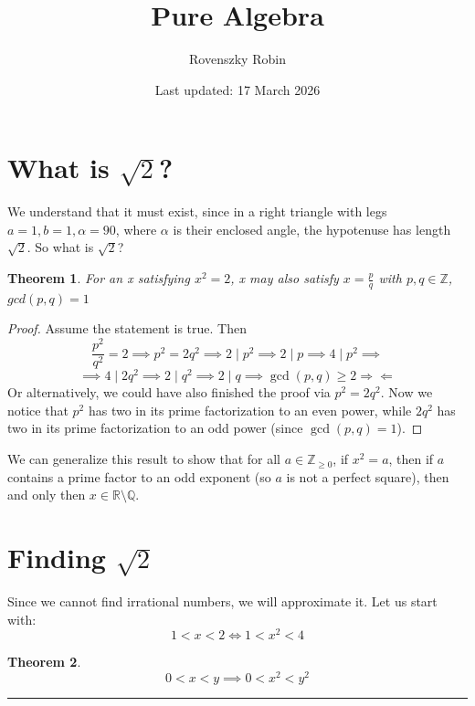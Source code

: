 \documentclass{article}
\title{Pure Algebra}
\author{Rovenszky Robin}
\date{Last updated: 17 March 2026}
\newtheorem{theorem}{Theorem}
\begin{document}
\maketitle

\section{What is $\sqrt{2}$?}
We understand that it must exist, since in a right triangle with legs $a = 1, b= 1, \alpha = 90$, where $\alpha$ is their enclosed angle, the hypotenuse has length $\sqrt{2}$. So what is $\sqrt{2}$?
\\
\begin{theorem}
    For an x satisfying $x^2 = 2$, x may also satisfy $x = \frac{p}{q}$ with $p, q \in \mathbb{Z}$, $gcd(p, q) = 1$
\end{theorem}
\begin{proof}
    Assume the statement is true. Then
    \begin{equation}
        \frac{p^2}{q^2} = 2 \implies p^2 = 2q^2 \implies 2 \mid p^2 \implies 2 \mid p \implies 4 \mid p^2 \implies
    \end{equation}
    \begin{equation}
        \implies 4 \mid 2q^2 \implies 2 \mid q^2 \implies 2 \mid q \implies \gcd(p, q) \ge 2 \Rightarrow\!\Leftarrow
    \end{equation}
    Or alternatively, we could have also finished the proof via
    $p^2 = 2q^2$. Now we notice that $p^2$ has two in its prime factorization to an even power, while $2q^2$ has two in its prime factorization to an odd power (since $\gcd(p,q) = 1$).
\end{proof}

We can generalize this result to show that for all $a \in \mathbb{Z}_{\ge 0}$, if $x^2 = a$, then if $a$ contains a prime factor to an odd exponent (so $a$ is not a perfect square), then and only then $x \in \mathbb{R} \setminus \mathbb{Q}$.

\section{Finding $\sqrt{2}$}
Since we cannot find irrational numbers, we will approximate it. Let us start with:
\[
1 < x < 2 \Leftrightarrow 1 < x^2 < 4
\]
\begin{theorem}
    \[
    0 < x < y \implies 0 < x^2 < y^2
    \]
\end{theorem}
\hrule
\vspace{1em}
\end{document}
